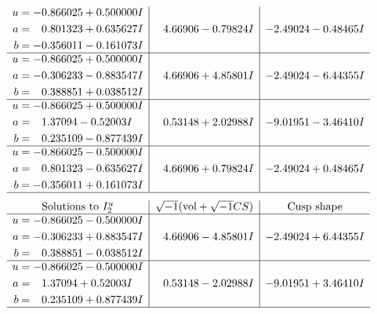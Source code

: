 \documentclass[1p]{elsarticle_modified}
\theoremstyle{definition}
\newcommand{\I}{\sqrt{-1}}
\begin{document}
$$\begin{array}{c|c|c}
\begin{aligned}
u &= -0.866025 + 0.500000 I \\
a &= \phantom{-}0.801323 + 0.635627 I \\
b &= -0.356011 - 0.161073 I\end{aligned}
 & \phantom{-}4.66906 - 0.79824 I & -2.49024 - 0.48465 I \\ \hline\begin{aligned}
u &= -0.866025 + 0.500000 I \\
a &= -0.306233 - 0.883547 I \\
b &= \phantom{-}0.388851 + 0.038512 I\end{aligned}
 & \phantom{-}4.66906 + 4.85801 I & -2.49024 - 6.44355 I \\ \hline\begin{aligned}
u &= -0.866025 + 0.500000 I \\
a &= \phantom{-}1.37094 - 0.52003 I \\
b &= \phantom{-}0.235109 - 0.877439 I\end{aligned}
 & \phantom{-}0.53148 + 2.02988 I & -9.01951 - 3.46410 I \\ \hline\begin{aligned}
u &= -0.866025 - 0.500000 I \\
a &= \phantom{-}0.801323 - 0.635627 I \\
b &= -0.356011 + 0.161073 I\end{aligned}
 & \phantom{-}4.66906 + 0.79824 I & -2.49024 + 0.48465 I\\
 \hline 
 \end{array}$$\newpage$$\begin{array}{c|c|c}  
\text{Solutions to }I^u_{2}& \I (\text{vol} + \sqrt{-1}CS) & \text{Cusp shape}\\
 \hline 
\begin{aligned}
u &= -0.866025 - 0.500000 I \\
a &= -0.306233 + 0.883547 I \\
b &= \phantom{-}0.388851 - 0.038512 I\end{aligned}
 & \phantom{-}4.66906 - 4.85801 I & -2.49024 + 6.44355 I \\ \hline\begin{aligned}
u &= -0.866025 - 0.500000 I \\
a &= \phantom{-}1.37094 + 0.52003 I \\
b &= \phantom{-}0.235109 + 0.877439 I\end{aligned}
 & \phantom{-}0.53148 - 2.02988 I & -9.01951 + 3.46410 I\\
 \hline 
 \end{array}$$\newpage\newpage\renewcommand{\arraystretch}{1}
\end{document}
